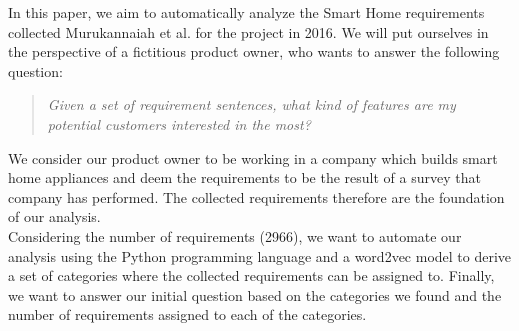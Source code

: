 In this paper, we aim to automatically analyze the Smart Home requirements collected Murukannaiah et al. for the \crowdre{} project\cite{murukannaiah_toward_2017} in 2016. We will put ourselves in the perspective of a fictitious product owner, who wants to answer the following question:\\
\begin{quote}
\textit{Given a set of requirement sentences, what kind of features are my potential customers interested in the most?}
\end{quote}

We consider our product owner to be working in a company which builds smart home appliances and deem the \crowdre{} requirements to be the result of a survey that company has performed. The collected requirements therefore are the foundation of our analysis.\\
Considering the number of requirements (2966), we want to automate our analysis using the Python programming language and a word2vec model to derive a set of categories where the collected requirements can be assigned to. Finally, we want to answer our initial question based on the categories we found and the number of requirements assigned to each of the categories.
